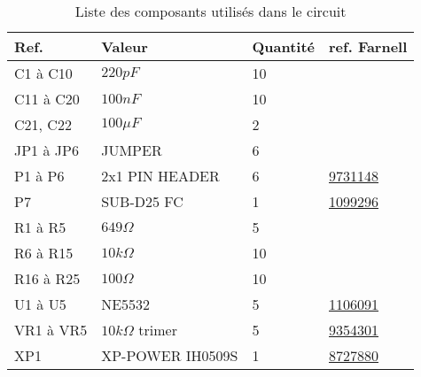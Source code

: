 \begin{fr}
\begin{table}[h]
\centering
        \begin{tabular}{|l|l|l|l|}
            \hline 
            Ref. & Valeur & Quantité & ref. Farnell\\
            \hline
            C1 à C10 & $220\unit{pF}$ & 10 & \\
            \hline 
            C11 à C20 & $100\unit{nF}$ & 10 & \\
            \hline 
            C21, C22 & $100\unit{\mu F}$ & 2 & \\
            \hline  
            JP1 à JP6 & JUMPER & 6 & \\
            \hline 
            P1 à P6 & 2x1 PIN HEADER & 6 & \href{http://fr.farnell.com/jsp/search/productdetail.jsp?sku=9731148}{9731148}\\
            \hline 
            P7 & SUB-D25 FC & 1 & \href{http://fr.farnell.com/jsp/search/productdetail.jsp?sku=1099296}{1099296}\\
	        \hline    
            R1 à R5 & $649\unit{\Omega}$ & 5 & \\
            \hline
            R6 à R15 & $10\unit{k\Omega}$ & 10 & \\
            \hline 
            R16 à R25 & $100\unit{\Omega}$ & 10 & \\ 
            \hline 
            U1 à U5 & NE5532 & 5 & \href{http://fr.farnell.com/jsp/search/productdetail.jsp?sku=1106091}{1106091}\\
            \hline 
            VR1 à VR5 & $10\unit{k\Omega}$ trimer & 5 & \href{http://fr.farnell.com/jsp/search/productdetail.jsp?sku=9354301}{9354301}\\
            \hline 
            XP1 & XP-POWER IH0509S & 1 & \href{http://fr.farnell.com/jsp/search/productdetail.jsp?sku=8727880}{8727880}\\
            \hline
        \end{tabular}
    \caption{\label{tab:comp_list} Liste des composants utilisés dans le circuit}
\end{table}
\end{fr}

